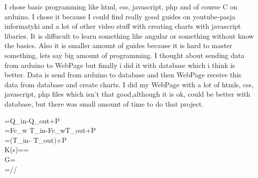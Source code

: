 I chose basic programming like html, css, javascript, php and of course C on arduino. I chose it because I could find really good guides on youtube-pasja informatyki and a lot of other video stuff with creating charts with javascript libaries. It is diffucult to learn something like angular or something without know the basics. Also it is smaller amount of guides because it is hard to master something, lets say big amount of programming. \newline
\newline
I thought about sending data from arduino to WebPage but finally i did it with database which i think is better. Data is send from arduino to database and then WebPage receive this data from database and create charts.\newline
I did my WebPage with a lot of htmls, css, javascript, php files which isn't that good,although it is ok, could be better with database, but there was small amount of time to do that project. 


=Q_{in}-Q_{out}+P\\
=F\cdot \rho \cdot c_w \cdot T_{in}-F\cdot \rho\cdot c_w\cdot T_{out}+P\\
=\cdot(T_{in}- T_{out})+\cdot P\\
K(s)==\\
G=\cdot{}\\
\tau=//